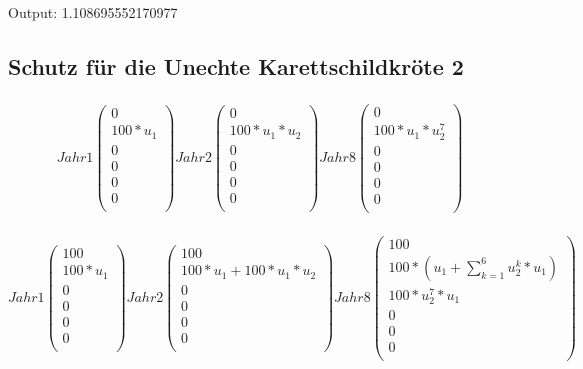 \documentclass{article}
\begin{document}
Output: 1.108695552170977

\subsection{Schutz für die Unechte Karettschildkröte 2}

\subsubsection{}
\[
Jahr 1
  \begin{pmatrix}
    0 \\
    100 * u_1 \\
    0 \\
    0 \\
    0 \\
    0 \\
  \end{pmatrix}
Jahr 2
  \begin{pmatrix}
    0 \\
    100 * u_1 * u_2 \\
    0 \\
    0 \\
    0 \\
    0 \\
  \end{pmatrix}
Jahr 8
  \begin{pmatrix}
    0 \\
    100 * u_1 * u_2^7 \\
    0 \\
    0 \\
    0 \\
    0 \\
  \end{pmatrix}
\]

\subsubsection{}
\[
Jahr 1
  \begin{pmatrix}
    100 \\
    100 * u_1 \\
    0 \\
    0 \\
    0 \\
    0 \\
  \end{pmatrix}
Jahr 2
  \begin{pmatrix}
    100 \\
    100 * u_1 + 100 * u_1 * u_2\\
    0 \\
    0 \\
    0 \\
    0 \\
  \end{pmatrix}
Jahr 8
  \begin{pmatrix}
    100 \\
    100 * (u_1 + \sum_{k=1}^{6} u_2^k * u_1) \\
    100 * u_2^7 * u_1 \\
    0 \\
    0 \\
    0 \\
  \end{pmatrix}
\]
\end{document}
